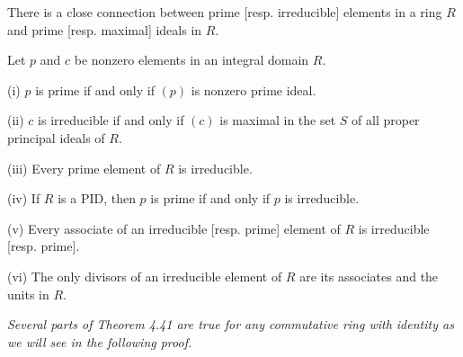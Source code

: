There is a close connection between prime [resp. irreducible] elements in a ring $R$ and prime [resp. maximal] ideals in $R$.
\begin{theorem}
Let $p$ and $c$ be nonzero elements in an integral domain $R$.\par
(i) $p$ is prime if and only if $(p)$ is nonzero prime ideal.\par
(ii) $c$ is irreducible if and only if $(c)$ is maximal in the set $S$ of all proper principal ideals of $R$.\par
(iii) Every prime element of $R$ is irreducible.\par
(iv) If $R$ is a PID, then $p$ is prime if and only if $p$ is irreducible.\par
(v) Every associate of an irreducible [resp. prime] element of $R$ is irreducible [resp. prime].\par
(vi) The only divisors of an irreducible element of $R$ are its associates and the units in $R$.
\end{theorem}
\begin{note}\em
Several parts of Theorem 4.41 are true for any commutative ring with identity as we will see in the following proof.
\end{note}
